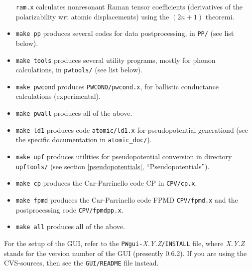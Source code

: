 \documentclass[12pt,a4paper]{article}
\begin{document}
\begin{itemize}
    \texttt{ram.x} calculates nonresonant Raman tensor coefficients
    (derivatives of the polarizability wrt atomic displacements)
    using the $(2n+1)$ theoremi.
  \item
    \texttt{make pp} produces several codes for data postprocessing, in
    \texttt{PP/} (see list below).
  \item
    \texttt{make tools} produces several utility programs, mostly for
    phonon calculations, in \texttt{pwtools/} (see list below).
  \item
    \texttt{make pwcond} produces \texttt{PWCOND/pwcond.x}, for
    ballistic conductance calculations (experimental).
  \item
    \texttt{make pwall} produces all of the above.
  \item
    \texttt{make ld1} produces code \texttt{atomic/ld1.x} for 
    pseudopotential generationd (see the specific
    documentation in \texttt{atomic\_doc/}).
  \item
    \texttt{make upf} produces utilities for pseudopotential
    conversion in directory \texttt{upftools/} (see section
    \ref{pseudopotentials}, ``Pseudopotentials'').
  \item
    \texttt{make cp} produces the Car-Parrinello code CP in
    \texttt{CPV/cp.x}.
  \item
    \texttt{make fpmd} produces the Car-Parrinello code FPMD
    \texttt{CPV/fpmd.x} and the postprocessing code 
    \texttt{CPV/fpmdpp.x}.
  \item
    \texttt{make all} produces all of the above.
\end{itemize}
For the setup of the GUI, refer to the
\texttt{PWgui-}\emph{X.Y.Z}\texttt{/INSTALL} file, where \emph{X.Y.Z}
stands for the version number of the GUI (presently 0.6.2).
If you are using the CVS-sources, then see the \texttt{GUI/README}
file instead.
\end{document}
